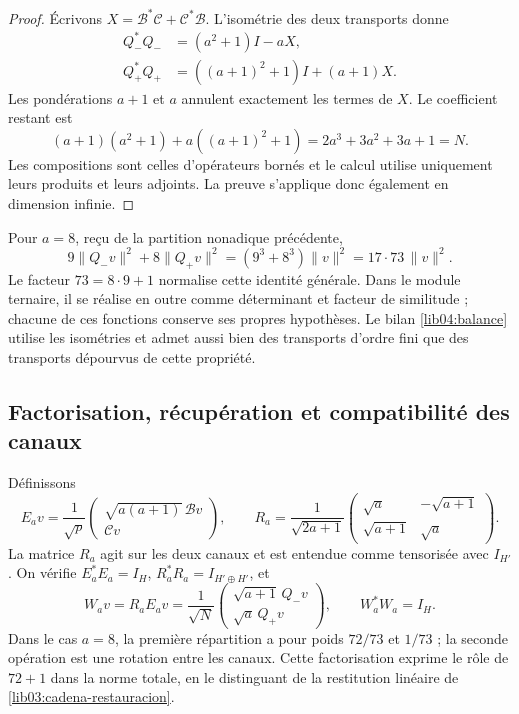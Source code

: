 \begin{proof}
Écrivons \(X=\mathcal B^*\mathcal C+\mathcal C^*\mathcal B\).
L’isométrie des deux transports donne
\begin{align*}
 Q_-^*Q_-&=(a^2+1)I-aX,\\
 Q_+^*Q_+&=((a+1)^2+1)I+(a+1)X.
\end{align*}
Les pondérations \(a+1\) et \(a\) annulent exactement les termes
de \(X\). Le coefficient restant est
\[
 (a+1)(a^2+1)+a((a+1)^2+1)
 =2a^3+3a^2+3a+1=N.
\]
Les compositions sont celles d’opérateurs bornés et le calcul utilise
uniquement leurs produits et leurs adjoints. La preuve s’applique donc
également en dimension infinie.
\end{proof}

Pour \(a=8\), reçu de la partition nonadique précédente,
\begin{equation}
 9\|Q_-v\|^2+8\|Q_+v\|^2
 =(9^3+8^3)\|v\|^2=17\cdot73\,\|v\|^2.
 \label{lib04:balance-canonico}
\end{equation}
Le facteur \(73=8\cdot9+1\) normalise cette identité générale. Dans le module ternaire, il se réalise en outre comme déterminant et facteur de similitude ; chacune de ces fonctions conserve ses propres hypothèses. Le bilan \eqref{lib04:balance} utilise les isométries et admet aussi bien des transports d'ordre fini que des transports dépourvus de cette propriété.

\subsection{Factorisation, récupération et compatibilité des canaux}
\label{lib04:factorizacion}

Définissons
\begin{equation}
 E_av=\frac1{\sqrt p}
 \begin{pmatrix}\sqrt{a(a+1)}\,\mathcal Bv\\\mathcal Cv\end{pmatrix},
 \qquad
 R_a=\frac1{\sqrt{2a+1}}
 \begin{pmatrix}\sqrt a&-\sqrt{a+1}\\
                 \sqrt{a+1}&\sqrt a\end{pmatrix}.
 \label{lib04:factorizacion-er}
\end{equation}
La matrice \(R_a\) agit sur les deux canaux et est entendue comme tensorisée
avec \(I_{H'}\). On vérifie
\(E_a^*E_a=I_H\), \(R_a^*R_a=I_{H'\oplus H'}\), et
\begin{equation}
 W_av=R_aE_av
 =\frac1{\sqrt N}
 \begin{pmatrix}\sqrt{a+1}\,Q_-v\\\sqrt a\,Q_+v\end{pmatrix},
 \qquad W_a^*W_a=I_H.
 \label{lib04:w}
\end{equation}
Dans le cas \(a=8\), la première répartition a pour poids \(72/73\) et
\(1/73\) ; la seconde opération est une rotation entre les canaux.
Cette factorisation exprime le rôle de \(72+1\) dans la norme
totale, en le distinguant de la restitution linéaire de
\eqref{lib03:cadena-restauracion}.


